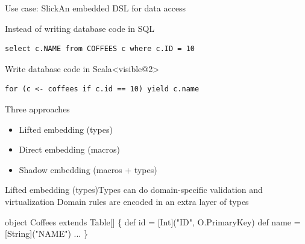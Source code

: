 \documentclass{beamer}
\begin{document}
\begin{frame}[fragile]{Use case: Slick}{An embedded DSL for data access}
  \vspace{1em}
  \begin{alertblock}{Instead of writing database code in SQL}
    \begin{verbatim}
select c.NAME from COFFEES c where c.ID = 10
    \end{verbatim}
  \end{alertblock}

  \vspace{1em}
  \begin{exampleblock}{Write database code in Scala}<visible@2>
    \begin{verbatim}
for (c <- coffees if c.id == 10) yield c.name
    \end{verbatim}
  \end{exampleblock}
\end{frame}

\begin{frame}{Three approaches}
  \begin{itemize}
    \item Lifted embedding (types)
    \item Direct embedding (macros)
    \item Shadow embedding (macros + types)
  \end{itemize}
\end{frame}

\begin{frame}[fragile]{Lifted embedding (types)}{Types can do domain-specific validation and virtualization}
  Domain rules are encoded in an extra layer of types
  \vspace{1em}

  \begin{semiverbatim}
object Coffees extends Table[\text{\color{blue}{(Int, String, ...)}}] \{
  def id = \text{\color{blue}{column}}[Int]("ID", O.PrimaryKey)
  def name = \text{\color{blue}{column}}[String]("NAME")
  ...
\}
  \end{semiverbatim}
\end{frame}
\end{document}
